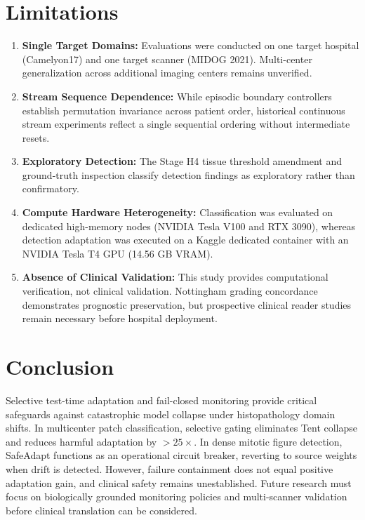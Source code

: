 \documentclass[conference]{IEEEtran}
\begin{document}
\section{Limitations}
\begin{enumerate}
\item \textbf{Single Target Domains:} Evaluations were conducted on one target hospital (Camelyon17) and one target scanner (MIDOG 2021). Multi-center generalization across additional imaging centers remains unverified.
\item \textbf{Stream Sequence Dependence:} While episodic boundary controllers establish permutation invariance across patient order, historical continuous stream experiments reflect a single sequential ordering without intermediate resets.
\item \textbf{Exploratory Detection:} The Stage H4 tissue threshold amendment and ground-truth inspection classify detection findings as exploratory rather than confirmatory.
\item \textbf{Compute Hardware Heterogeneity:} Classification was evaluated on dedicated high-memory nodes (NVIDIA Tesla V100 and RTX 3090), whereas detection adaptation was executed on a Kaggle dedicated container with an NVIDIA Tesla T4 GPU (14.56 GB VRAM).
\item \textbf{Absence of Clinical Validation:} This study provides computational verification, not clinical validation. Nottingham grading concordance demonstrates prognostic preservation, but prospective clinical reader studies remain necessary before hospital deployment.
\end{enumerate}

\section{Conclusion}
Selective test-time adaptation and fail-closed monitoring provide critical safeguards against catastrophic model collapse under histopathology domain shifts.
In multicenter patch classification, selective gating eliminates Tent collapse and reduces harmful adaptation by $>25\times$.
In dense mitotic figure detection, SafeAdapt functions as an operational circuit breaker, reverting to source weights when drift is detected.
However, failure containment does not equal positive adaptation gain, and clinical safety remains unestablished.
Future research must focus on biologically grounded monitoring policies and multi-scanner validation before clinical translation can be considered.
\end{document}

